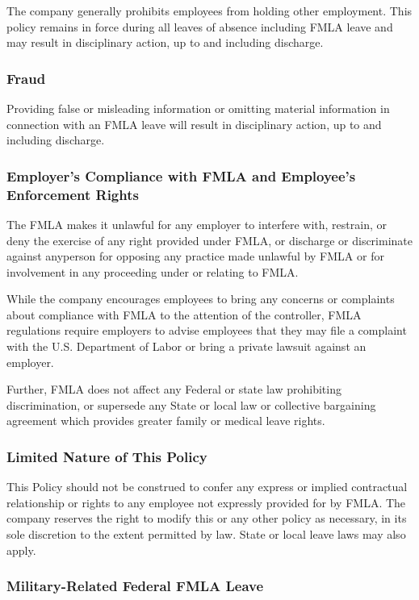 The company generally prohibits employees from holding other employment. This policy remains in force during all leaves of absence including FMLA leave and may result in disciplinary action, up to and including discharge.

\subsubsection{Fraud}

Providing false or misleading information or omitting material information in connection with an FMLA leave will result in disciplinary action, up to and including discharge.

\subsubsection{Employer's Compliance with FMLA and Employee's Enforcement Rights}

The FMLA makes it unlawful for any employer to interfere with, restrain, or deny the exercise of any right provided under FMLA, or discharge or discriminate against anyperson for opposing any practice made unlawful by FMLA or for involvement in any proceeding under or relating to FMLA.

While the company encourages employees to bring any concerns or complaints about compliance with FMLA to the attention of the controller, FMLA regulations require employers to advise employees that they may file a complaint with the U.S. Department of Labor or bring a private lawsuit against an employer.

Further, FMLA does not affect any Federal or state law prohibiting discrimination, or supersede any State or local law or collective bargaining agreement which provides greater family or medical leave rights.

\subsubsection{Limited Nature of This Policy}

This Policy should not be construed to confer any express or implied contractual relationship or rights to any employee not expressly provided for by FMLA. The company reserves the right to modify this or any other policy as necessary, in its sole discretion to the extent permitted by law. State or local leave laws may also apply.

\subsubsection{Military-Related Federal FMLA Leave}

